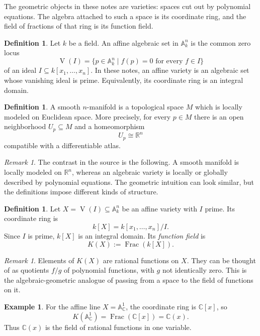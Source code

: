 \documentclass[11pt]{article}
\theoremstyle{definition}
\newtheorem{definition}[theorem]{Definition}
\newtheorem{example}[theorem]{Example}
\theoremstyle{remark}
\newtheorem{remark}[theorem]{Remark}
\newcommand{\A}{\mathbb{A}}
\newcommand{\C}{\mathbb{C}}
\newcommand{\K}{K}
\newcommand{\V}{\operatorname{V}}
\newcommand{\Frac}{\operatorname{Frac}}
\begin{document}
The geometric objects in these notes are varieties: spaces cut out by
polynomial equations.  The algebra attached to such a space is its coordinate
ring, and the field of fractions of that ring is its function field.

\begin{definition}
Let \(k\) be a field.  An affine algebraic set in \(\A^n_k\) is the common
zero locus
\[
  \V(I)=\{p\in \A^n_k \mid f(p)=0\text{ for every }f\in I\}
\]
of an ideal \(I\subseteq k[x_1,\ldots,x_n]\).  In these notes, an affine
variety is an algebraic set whose vanishing ideal is prime.  Equivalently, its
coordinate ring is an integral domain.
\end{definition}

\begin{definition}
A smooth \(n\)-manifold is a topological space \(M\) which is locally modeled
on Euclidean space.  More precisely, for every \(p\in M\) there is an open
neighborhood \(U_p\subseteq M\) and a homeomorphism
\[
  U_p\cong \mathbb{R}^n
\]
compatible with a differentiable atlas.
\end{definition}

\begin{remark}
The contrast in the source is the following.  A smooth manifold is locally
modeled on \(\mathbb{R}^n\), whereas an algebraic variety is locally or
globally described by polynomial equations.  The geometric intuition can look
similar, but the definitions impose different kinds of structure.
\end{remark}

\begin{definition}
Let \(X=\V(I)\subseteq \A^n_k\) be an affine variety with \(I\) prime.  Its
coordinate ring is
\[
  k[X]=k[x_1,\ldots,x_n]/I.
\]
Since \(I\) is prime, \(k[X]\) is an integral domain.  Its \emph{function
field} is
\[
  \K(X):=\Frac(k[X]).
\]
\end{definition}

\begin{remark}
Elements of \(\K(X)\) are rational functions on \(X\).  They can be thought of
as quotients \(f/g\) of polynomial functions, with \(g\) not identically zero.
This is the algebraic-geometric analogue of passing from a space to the field
of functions on it.
\end{remark}

\begin{example}
For the affine line \(X=\A^1_{\C}\), the coordinate ring is \(\C[x]\), so
\[
  \K(\A^1_{\C})=\Frac(\C[x])=\C(x).
\]
Thus \(\C(x)\) is the field of rational functions in one variable.
\end{example}
\end{document}
